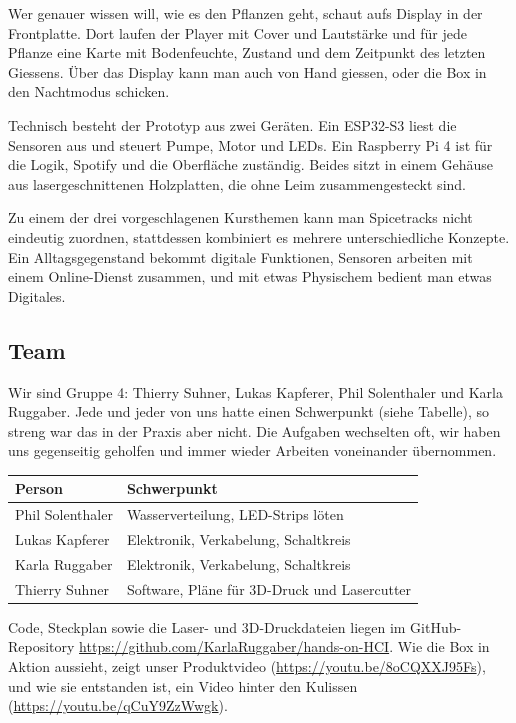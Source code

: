 \documentclass[11pt,a4paper]{article}
\begin{document}
Wer genauer wissen will, wie es den Pflanzen geht, schaut aufs Display in der Frontplatte. Dort laufen der Player mit Cover und Lautstärke und für jede Pflanze eine Karte mit Bodenfeuchte, Zustand und dem Zeitpunkt des letzten Giessens. Über das Display kann man auch von Hand giessen, oder die Box in den Nachtmodus schicken.

Technisch besteht der Prototyp aus zwei Geräten. Ein ESP32-S3 liest die Sensoren aus und steuert Pumpe, Motor und LEDs. Ein Raspberry Pi 4 ist für die Logik, Spotify und die Oberfläche zuständig. Beides sitzt in einem Gehäuse aus lasergeschnittenen Holzplatten, die ohne Leim zusammengesteckt sind.

Zu einem der drei vorgeschlagenen Kursthemen kann man Spicetracks nicht eindeutig zuordnen, stattdessen kombiniert es mehrere unterschiedliche Konzepte. Ein Alltagsgegenstand bekommt digitale Funktionen, Sensoren arbeiten mit einem Online-Dienst zusammen, und mit etwas Physischem bedient man etwas Digitales.

\subsection{Team}

Wir sind Gruppe 4: Thierry Suhner, Lukas Kapferer, Phil Solenthaler und Karla Ruggaber. Jede und jeder von uns hatte einen Schwerpunkt (siehe Tabelle), so streng war das in der Praxis aber nicht. Die Aufgaben wechselten oft, wir haben uns gegenseitig geholfen und immer wieder Arbeiten voneinander übernommen.

\begin{table}[H]
\centering
\begin{tabularx}{\linewidth}{lL}
\toprule
\textbf{Person} & \textbf{Schwerpunkt} \\
\midrule
Phil Solenthaler & Wasserverteilung, LED-Strips löten \\
Lukas Kapferer & Elektronik, Verkabelung, Schaltkreis \\
Karla Ruggaber & Elektronik, Verkabelung, Schaltkreis \\
Thierry Suhner & Software, Pläne für 3D-Druck und Lasercutter \\
\bottomrule
\end{tabularx}
\end{table}

Code, Steckplan sowie die Laser- und 3D-Druckdateien liegen im GitHub-Repository \url{https://github.com/KarlaRuggaber/hands-on-HCI}. Wie die Box in Aktion aussieht, zeigt unser Produktvideo (\url{https://youtu.be/8oCQXXJ95Fs}), und wie sie entstanden ist, ein Video hinter den Kulissen (\url{https://youtu.be/qCuY9ZzWwgk}).
\end{document}
